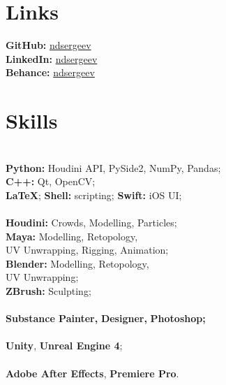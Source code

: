 \documentclass[]{cv-class}
\begin{document}
\begin{minipage}[t]{0.35\textwidth}
\section{Links}
\textcolor{subsec_col}{\textbf{GitHub:}} \href{https://github.com/ndsergeev}{ndsergeev} \\
\textcolor{subsec_col}{\textbf{LinkedIn:}} \href{https://www.linkedin.com/in/ndsergeev/}{ndsergeev} \\
\textcolor{subsec_col}{\textbf{Behance:}} \href{https://www.behance.net/ndsergeev}{ndsergeev}

\smallSeparator{0.4pt}
\section{Skills}
{} \\
\textbf{Python:} Houdini API, PySide2, NumPy, Pandas; \\
\textbf{C++:} Qt, OpenCV; \\ 
\textbf{\LaTeX};
\textbf{Shell:} scripting;
\textbf{Swift:} iOS UI; \\

{} \\
\textbf{Houdini:} Crowds, Modelling, Particles; \\
\textbf{Maya:} Modelling, Retopology, \\UV Unwrapping, Rigging, Animation; \\
\textbf{Blender:} Modelling, Retopology, \\UV Unwrapping; \\
\textbf{ZBrush:} Sculpting; \\

{} \\
\textbf{Substance Painter,}
\textbf{Designer,}
\textbf{Photoshop;} \\

{} \\
\textbf{Unity},
\textbf{Unreal Engine 4}; \\

{} \\
\textbf{Adobe After Effects},
\textbf{Premiere Pro}.




\end{minipage}
\end{document}
